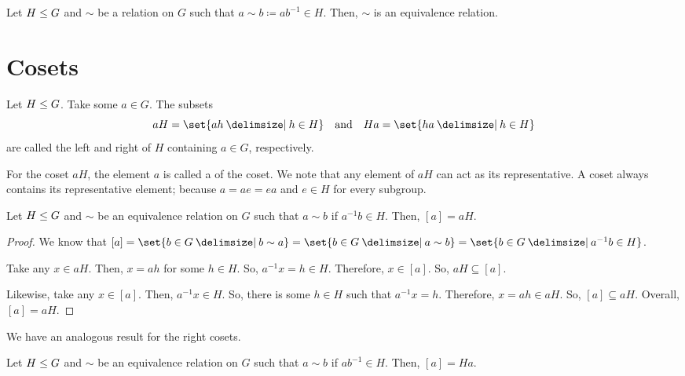 \documentclass[11pt]{penrose}
\begin{document}
\begin{nthm}
    Let $H \mathrel{\leq} G$ and $\sim$ be a relation on $G$ such that $a \sim b \coloneq a b^{-1} \in H$. Then, $\sim$ is an equivalence relation.
\end{nthm}

\section{Cosets}
\begin{ndfn}
    Let $H \mathrel{\leq} G$. Take some $a \in G$. The subsets
    \begin{equation*}
        aH = \set{ah \st h \in H}
        \quad\text{and}\quad
        Ha = \set{ha \st h \in H}
    \end{equation*}
    are called the left and right  of $H$ containing $a \in G$, respectively.
\end{ndfn}

For the coset $aH$, the element $a$ is called a  of the coset. We note that any element of $aH$ can act as its representative. A coset always contains its representative element; because $a = a e = e a$ and $e \in H$ for every subgroup.

\begin{nthm}
    Let $H \mathrel{\leq} G$ and $\sim$ be an equivalence relation on $G$ such that $a \sim b$ if $a^{-1} b \in H$. Then, $[a] = aH$.
\end{nthm}
\begin{proof}
    We know that $[a] = \set{b \in G \st b \sim a} = \set{b \in G \st a \sim b} = \set{b \in G \st a^{-1} b \in H}$.

    Take any $x \in aH$. Then, $x = ah$ for some $h \in H$. So, $a^{-1} x = h \in H$. Therefore, $x \in [a]$. So, $aH \subseteq [a]$.

    Likewise, take any $x \in [a]$. Then, $a^{-1} x \in H$. So, there is some $h \in H$ such that $a^{-1} x = h$. Therefore, $x = ah \in aH$. So, $[a] \subseteq aH$. Overall, $[a] = aH$.
\end{proof}

We have an analogous result for the right cosets.
\begin{nthm}
    Let $H \mathrel{\leq} G$ and $\sim$ be an equivalence relation on $G$ such that $a \sim b$ if $a b^{-1} \in H$. Then, $[a] = Ha$.
\end{nthm}
\end{document}
